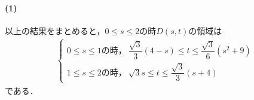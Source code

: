 \documentclass[../../main.tex]{subfiles}
\begin{document}
\paragraph{(1)}

以上の結果をまとめると，$0 \le s \le 2$の時$D(s,t)$の領域は
\begin{align}
  \begin{cases}
    0\le s\le1\text{の時，}\ \dfrac{\sqrt{3}}{3}(4-s)\le t\le\dfrac{\sqrt{3}}{6}(s^2+9)\\
    1\le s\le2\text{の時，}\ \sqrt{3}s\le t\le\dfrac{\sqrt{3}}{3}(s+4)
  \end{cases}
\end{align}
である．
\end{document}
